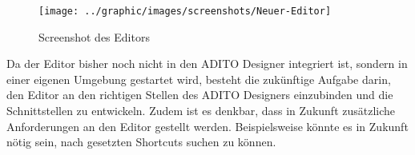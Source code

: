 \vfill

\begin{figure}[H]
	\centering
	\texttt{[image: ../graphic/images/screenshots/Neuer-Editor]}
	\caption{Screenshot des Editors}
	\label{fig:neuer-editor}
\end{figure}

\vfill

Da der Editor bisher noch nicht in den ADITO Designer integriert ist, sondern in einer eigenen Umgebung gestartet wird, besteht die zukünftige Aufgabe darin, den Editor an den richtigen Stellen des ADITO Designers einzubinden und die Schnittstellen zu entwickeln. Zudem ist es denkbar, dass in Zukunft zusätzliche Anforderungen an den Editor gestellt werden. Beispielsweise könnte es in Zukunft nötig sein, nach gesetzten Shortcuts suchen zu können.
